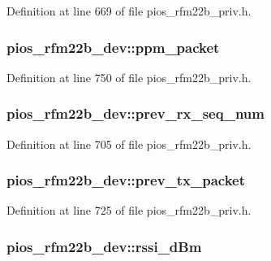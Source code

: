 Definition at line 669 of file pios\-\_\-rfm22b\-\_\-priv.\-h.

\hypertarget{structpios__rfm22b__dev_abdfbc812f36087f9b8392e9303f28086}{
\subsubsection[{ppm\-\_\-packet}]{ pios\-\_\-rfm22b\-\_\-dev\-::ppm\-\_\-packet}}\label{structpios__rfm22b__dev_abdfbc812f36087f9b8392e9303f28086}


Definition at line 750 of file pios\-\_\-rfm22b\-\_\-priv.\-h.

\hypertarget{structpios__rfm22b__dev_a932f3bf8b3d7c94a5404fad6ff6801d4}{
\subsubsection[{prev\-\_\-rx\-\_\-seq\-\_\-num}]{ pios\-\_\-rfm22b\-\_\-dev\-::prev\-\_\-rx\-\_\-seq\-\_\-num}}\label{structpios__rfm22b__dev_a932f3bf8b3d7c94a5404fad6ff6801d4}


Definition at line 705 of file pios\-\_\-rfm22b\-\_\-priv.\-h.

\hypertarget{structpios__rfm22b__dev_a4c0368362858e8e4450ce094670e9b3d}{
\subsubsection[{prev\-\_\-tx\-\_\-packet}]{ pios\-\_\-rfm22b\-\_\-dev\-::prev\-\_\-tx\-\_\-packet}}\label{structpios__rfm22b__dev_a4c0368362858e8e4450ce094670e9b3d}


Definition at line 725 of file pios\-\_\-rfm22b\-\_\-priv.\-h.

\hypertarget{structpios__rfm22b__dev_a7efa2c785a1c9feaff4db472c1f22805}{
\subsubsection[{rssi\-\_\-d\-Bm}]{ pios\-\_\-rfm22b\-\_\-dev\-::rssi\-\_\-d\-Bm}}\label{structpios__rfm22b__dev_a7efa2c785a1c9feaff4db472c1f22805}


